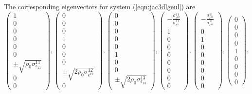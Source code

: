 \documentclass{article}
\begin{document}
The corresponding eigenvectors for system (\ref{eqn:jac3dlgeul}) are
\begin{equation}
\left ( \begin{array}{c} 1\\0\\0\\0\\0\\0\\ \pm\sqrt{\rho_0 \sigma^{11}_{\epsilon_{11}}}\\ 0\\0
\end{array}
\right ),
\left ( \begin{array}{c} 0\\0\\0\\1\\0\\0\\0\\\pm \sqrt{2 \rho_0 \sigma^{12}_{\epsilon^{12}}}\\0
\end{array}
\right),
\left ( \begin{array}{c} 0\\0\\0\\0\\0\\1\\0\\0\\ \pm\sqrt{2 \rho_0 \sigma^{13}_{\epsilon_{13}}}
\end{array}
\right ),
\left ( \begin{array}{c}-\frac{\sigma^{11}_{\epsilon^{22}}}{\sigma^{11}_{\epsilon^{11}}}\\1\\0\\0\\0\\0\\0\\0\\0
\end{array}
\right ),
\left ( \begin{array}{c}-\frac{\sigma^{11}_{\epsilon^{33}}}{\sigma^{11}_{\epsilon^{11}}}\\0\\1\\0\\0\\0\\0\\0\\0
\end{array}
\right ),
\left ( \begin{array}{c}0\\0\\0\\0\\1\\0\\0\\0\\0
\end{array}
\right ).
\label{eqn:3dlgeulevec}
\end{equation}
\end{document}
